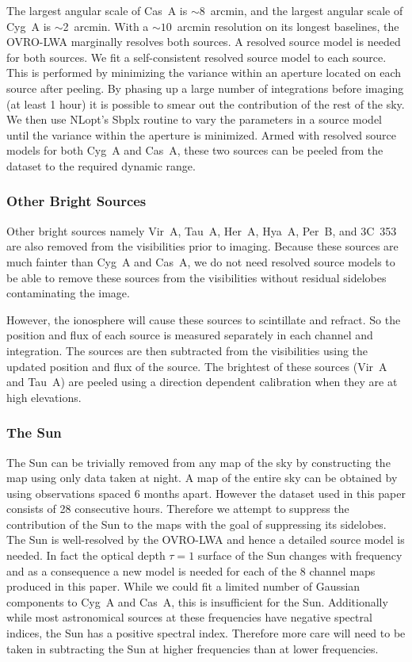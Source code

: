 \documentclass[twocolumn]{aastex61}
\begin{document}
The largest angular scale of Cas~A is $\sim$8~arcmin, and the largest angular scale of Cyg~A is
$\sim$2~arcmin. With a $\sim10$~arcmin resolution on its longest baselines, the OVRO-LWA marginally
resolves both sources. A resolved source model is needed for both sources. We fit a self-consistent
resolved source model to each source. This is performed by minimizing the variance within an
aperture located on each source after peeling. By phasing up a large number of integrations before
imaging (at least 1 hour) it is possible to smear out the contribution of the rest of the sky.  We
then use NLopt's Sbplx routine \citep{nlopt, sbplx} to vary the parameters in a source model until
the variance within the aperture is minimized.  Armed with resolved source models for both Cyg~A and
Cas~A, these two sources can be peeled from the dataset to the required dynamic range.

\subsubsection{Other Bright Sources}

Other bright sources namely Vir~A, Tau~A, Her~A, Hya~A, Per~B, and 3C~353 are also removed from
the visibilities prior to imaging. Because these sources are much fainter than Cyg~A and Cas~A, we
do not need resolved source models to be able to remove these sources from the visibilities without
residual sidelobes contaminating the image.

However, the ionosphere will cause these sources to scintillate and refract. So the position and
flux of each source is measured separately in each channel and integration. The sources are then
subtracted from the visibilities using the updated position and flux of the source. The brightest of
these sources (Vir~A and Tau~A) are peeled using a direction dependent calibration when they are
at high elevations.

\subsubsection{The Sun}

The Sun can be trivially removed from any map of the sky by constructing the map using only data
taken at night. A map of the entire sky can be obtained by using observations spaced 6 months apart.
However the dataset used in this paper consists of 28 consecutive hours. Therefore we attempt to
suppress the contribution of the Sun to the maps with the goal of suppressing its sidelobes.  The
Sun is well-resolved by the OVRO-LWA and hence a detailed source model is needed. In fact the
optical depth $\tau=1$ surface of the Sun changes with frequency and as a consequence a new model is
needed for each of the 8 channel maps produced in this paper. While we could fit a limited number of
Gaussian components to Cyg~A and Cas~A, this is insufficient for the Sun.  Additionally while most
astronomical sources at these frequencies have negative spectral indices, the Sun has a positive
spectral index. Therefore more care will need to be taken in subtracting the Sun at higher
frequencies than at lower frequencies.
\end{document}
